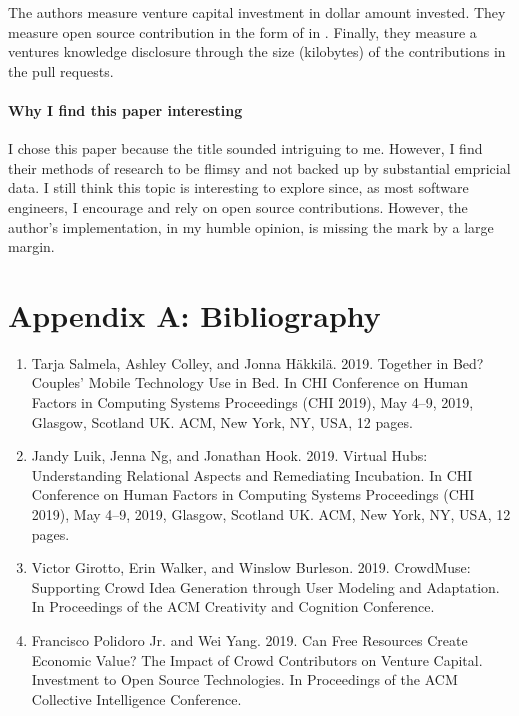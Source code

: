 The authors measure venture capital investment in dollar amount invested. They measure open source contribution in the form of  in . Finally, they measure a ventures knowledge disclosure through the size (kilobytes) of the contributions in the pull requests.

\paragraph{Why I find this paper interesting}
I chose this paper because the title sounded intriguing to me. However, I find their methods of research to be flimsy and not backed up by substantial empricial data. I still think this topic is interesting to explore since, as most software engineers, I encourage and rely on open source contributions. However, the author's implementation, in my humble opinion, is missing the mark by a large margin.

\clearpage

\section{Appendix A: Bibliography}

\begin{enumerate}
\item
  Tarja Salmela, Ashley Colley, and Jonna Häkkilä. 2019. Together in Bed? Couples’ Mobile Technology Use in Bed. In CHI Conference on Human Factors in Computing Systems Proceedings (CHI 2019), May 4–9, 2019, Glasgow, Scotland UK. ACM, New York, NY, USA, 12 pages. 
\item
  Jandy Luik, Jenna Ng, and Jonathan Hook. 2019. Virtual Hubs: Understanding Relational Aspects and Remediating Incubation. In CHI Conference on Human Factors in Computing Systems Proceedings (CHI 2019), May 4–9, 2019, Glasgow, Scotland UK. ACM, New York, NY, USA, 12 pages. 
\item
  Victor Girotto, Erin Walker, and Winslow Burleson. 2019. CrowdMuse: Supporting Crowd Idea Generation through User Modeling and Adaptation. In Proceedings of the ACM Creativity and Cognition Conference. 
\item
  Francisco Polidoro Jr. and Wei Yang. 2019. Can Free Resources Create Economic Value? The Impact of Crowd Contributors on Venture Capital. Investment to Open Source Technologies. In Proceedings of the ACM Collective Intelligence Conference. 
\end{enumerate}

